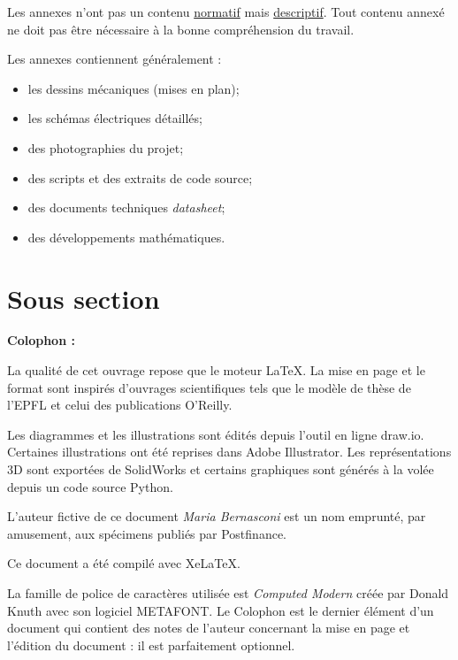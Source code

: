 \documentclass[
    iai, %
    il, %
]{heig-tb}
\begin{document}
Les annexes n'ont pas un contenu \underline{normatif} mais \underline{descriptif}. Tout contenu annexé ne doit pas être nécessaire à la bonne compréhension du travail.

Les annexes contiennent généralement :

\begin{itemize}
    \item les dessins mécaniques (mises en plan);
    \item les schémas électriques détaillés;
    \item des photographies du projet;
    \item des scripts et des extraits de code source;
    \item des documents techniques \pex \emph{datasheet};
    \item des développements mathématiques.
\end{itemize}
\section{Sous section}
\lipsum[1]

\let\cleardoublepage\clearpage
\backmatter

\label{glossaire}
\printnoidxglossary
\printbibliography
\label{index}
\printindex

\clearpage
\Large\textbf{Colophon :}\par\normalsize
\thispagestyle{empty}
La qualité de cet ouvrage repose que le moteur \LaTeX. La mise en page et le format sont inspirés d'ouvrages scientifiques tels que le modèle de thèse de l'EPFL et celui des publications O'Reilly.

Les diagrammes et les illustrations sont édités depuis l'outil en ligne draw.io. Certaines illustrations ont été reprises dans Adobe Illustrator. Les représentations 3D sont exportées de SolidWorks et certains graphiques sont générés à la volée depuis un code source Python.

L'auteur fictive de ce document \emph{Maria Bernasconi} est un nom emprunté, par amusement, aux spécimens publiés par Postfinance.

Ce document a été compilé avec XeLaTeX.

La famille de police de caractères utilisée est \emph{Computed Modern} créée par Donald Knuth avec son logiciel METAFONT.
\vfil
Le Colophon est le dernier élément d'un document qui contient des notes de l'auteur concernant la mise en page et l'édition du document : il est parfaitement optionnel.
\end{document}
